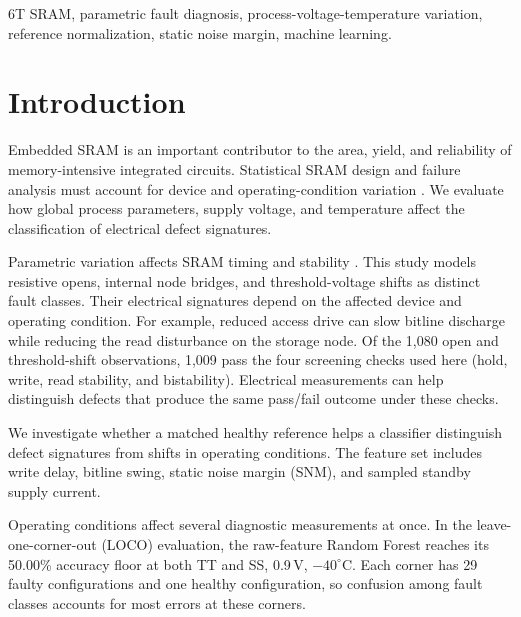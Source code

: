 \documentclass[conference]{IEEEtran}
\begin{document}
\begin{IEEEkeywords}
6T SRAM, parametric fault diagnosis, process-voltage-temperature variation, reference normalization, static noise margin, machine learning.

\end{IEEEkeywords}

\section{Introduction}
\label{sec:intro}

Embedded SRAM is an important contributor to the area, yield, and reliability of memory-intensive integrated circuits. Statistical SRAM design and failure analysis must account for device and operating-condition variation \cite{mukhopadhyay2005modeling}. We evaluate how global process parameters, supply voltage, and temperature affect the classification of electrical defect signatures.

Parametric variation affects SRAM timing and stability \cite{mukhopadhyay2007memories}. This study models resistive opens, internal node bridges, and threshold-voltage shifts as distinct fault classes. Their electrical signatures depend on the affected device and operating condition. For example, reduced access drive can slow bitline discharge while reducing the read disturbance on the storage node. Of the 1,080 open and threshold-shift observations, 1,009 pass the four screening checks used here (hold, write, read stability, and bistability). Electrical measurements can help distinguish defects that produce the same pass/fail outcome under these checks.

We investigate whether a matched healthy reference helps a classifier distinguish defect signatures from shifts in operating conditions. The feature set includes write delay, bitline swing, static noise margin (SNM), and sampled standby supply current.

Operating conditions affect several diagnostic measurements at once. In the leave-one-corner-out (LOCO) evaluation, the raw-feature Random Forest reaches its 50.00\% accuracy floor at both TT and SS, 0.9\,V, $-40^\circ$C. Each corner has 29 faulty configurations and one healthy configuration, so confusion among fault classes accounts for most errors at these corners.
\end{document}
